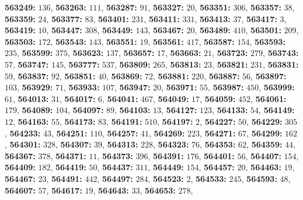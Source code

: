 \textsf{\bfseries 563249:} $136$, \textsf{\bfseries 563263:} $111$, \textsf{\bfseries 563287:} $91$, \textsf{\bfseries 563327:} $20$, \textsf{\bfseries 563351:} $306$, \textsf{\bfseries 563357:} $38$, \textsf{\bfseries 563359:} $24$, \textsf{\bfseries 563377:} $83$, \textsf{\bfseries 563401:} $231$, \textsf{\bfseries 563411:} $331$, \textsf{\bfseries 563413:} $37$, \textsf{\bfseries 563417:} $3$, \textsf{\bfseries 563419:} $10$, \textsf{\bfseries 563447:} $308$, \textsf{\bfseries 563449:} $143$, \textsf{\bfseries 563467:} $20$, \textsf{\bfseries 563489:} $410$, \textsf{\bfseries 563501:} $209$, \textsf{\bfseries 563503:} $172$, \textsf{\bfseries 563543:} $143$, \textsf{\bfseries 563551:} $19$, \textsf{\bfseries 563561:} $417$, \textsf{\bfseries 563587:} $154$, \textsf{\bfseries 563593:} $235$, \textsf{\bfseries 563599:} $375$, \textsf{\bfseries 563623:} $137$, \textsf{\bfseries 563657:} $17$, \textsf{\bfseries 563663:} $21$, \textsf{\bfseries 563723:} $279$, \textsf{\bfseries 563743:} $57$, \textsf{\bfseries 563747:} $145$, \textsf{\bfseries 563777:} $537$, \textsf{\bfseries 563809:} $265$, \textsf{\bfseries 563813:} $23$, \textsf{\bfseries 563821:} $231$, \textsf{\bfseries 563831:} $59$, \textsf{\bfseries 563837:} $92$, \textsf{\bfseries 563851:} $40$, \textsf{\bfseries 563869:} $72$, \textsf{\bfseries 563881:} $220$, \textsf{\bfseries 563887:} $56$, \textsf{\bfseries 563897:} $103$, \textsf{\bfseries 563929:} $71$, \textsf{\bfseries 563933:} $107$, \textsf{\bfseries 563947:} $20$, \textsf{\bfseries 563971:} $55$, \textsf{\bfseries 563987:} $450$, \textsf{\bfseries 563999:} $61$, \textsf{\bfseries 564013:} $31$, \textsf{\bfseries 564017:} $6$, \textsf{\bfseries 564041:} $467$, \textsf{\bfseries 564049:} $17$, \textsf{\bfseries 564059:} $452$, \textsf{\bfseries 564061:} $179$, \textsf{\bfseries 564089:} $104$, \textsf{\bfseries 564097:} $89$, \textsf{\bfseries 564103:} $13$, \textsf{\bfseries 564127:} $123$, \textsf{\bfseries 564133:} $54$, \textsf{\bfseries 564149:} $12$, \textsf{\bfseries 564163:} $55$, \textsf{\bfseries 564173:} $83$, \textsf{\bfseries 564191:} $510$, \textsf{\bfseries 564197:} $2$, \textsf{\bfseries 564227:} $50$, \textsf{\bfseries 564229:} $305$, \textsf{\bfseries 564233:} $43$, \textsf{\bfseries 564251:} $110$, \textsf{\bfseries 564257:} $41$, \textsf{\bfseries 564269:} $223$, \textsf{\bfseries 564271:} $67$, \textsf{\bfseries 564299:} $162$, \textsf{\bfseries 564301:} $328$, \textsf{\bfseries 564307:} $39$, \textsf{\bfseries 564313:} $228$, \textsf{\bfseries 564323:} $76$, \textsf{\bfseries 564353:} $62$, \textsf{\bfseries 564359:} $44$, \textsf{\bfseries 564367:} $378$, \textsf{\bfseries 564371:} $11$, \textsf{\bfseries 564373:} $396$, \textsf{\bfseries 564391:} $176$, \textsf{\bfseries 564401:} $56$, \textsf{\bfseries 564407:} $154$, \textsf{\bfseries 564409:} $182$, \textsf{\bfseries 564419:} $50$, \textsf{\bfseries 564437:} $311$, \textsf{\bfseries 564449:} $154$, \textsf{\bfseries 564457:} $20$, \textsf{\bfseries 564463:} $19$, \textsf{\bfseries 564467:} $23$, \textsf{\bfseries 564491:} $442$, \textsf{\bfseries 564497:} $284$, \textsf{\bfseries 564523:} $2$, \textsf{\bfseries 564533:} $245$, \textsf{\bfseries 564593:} $48$, \textsf{\bfseries 564607:} $57$, \textsf{\bfseries 564617:} $19$, \textsf{\bfseries 564643:} $33$, \textsf{\bfseries 564653:} $278$, 
